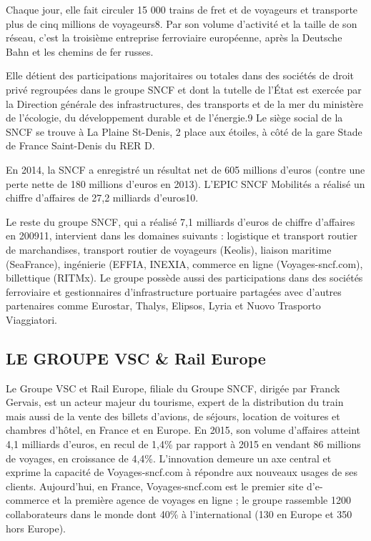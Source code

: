 Chaque jour, elle fait circuler 15 000 trains de fret et de voyageurs et transporte plus de cinq millions de voyageurs8. Par son volume d'activité et la taille de son réseau, c'est la troisième entreprise ferroviaire européenne, après la Deutsche Bahn et les chemins de fer russes.

Elle détient des participations majoritaires ou totales dans des sociétés de droit privé regroupées dans le groupe SNCF et dont la tutelle de l'État est exercée par la Direction générale des infrastructures, des transports et de la mer du ministère de l'écologie, du développement durable et de l'énergie.9 Le siège social de la SNCF se trouve à La Plaine St-Denis, 2 place aux étoiles, à côté de la gare Stade de France Saint-Denis du RER D.

En 2014, la SNCF a enregistré un résultat net de 605 millions d'euros (contre une perte nette de 180 millions d'euros en 2013). L'EPIC SNCF Mobilités a réalisé un chiffre d'affaires de 27,2 milliards d'euros10.

Le reste du groupe SNCF, qui a réalisé 7,1 milliards d'euros de chiffre d'affaires en 200911, intervient dans les domaines suivants : logistique et transport routier de marchandises, transport routier de voyageurs (Keolis), liaison maritime (SeaFrance), ingénierie (EFFIA, INEXIA, commerce en ligne (Voyages-sncf.com), billettique (RITMx). Le groupe possède aussi des participations dans des sociétés ferroviaire et gestionnaires d'infrastructure portuaire partagées avec d'autres partenaires comme Eurostar, Thalys, Elipsos, Lyria et Nuovo Trasporto Viaggiatori.

\clearpage

\subsection{LE GROUPE VSC \& Rail Europe}
Le Groupe VSC et Rail Europe, filiale du Groupe SNCF, dirigée par Franck Gervais, est un acteur majeur du tourisme, expert de la distribution du train mais aussi de la vente des billets d'avions, de séjours, location de voitures et chambres d'hôtel, en France et en Europe. En 2015, son volume d’affaires atteint 4,1 milliards d’euros, en recul de 1,4\% par rapport à 2015 en vendant 86 millions de voyages, en croissance de 4,4\%. L’innovation demeure un axe central et exprime la capacité de Voyages-sncf.com à répondre aux nouveaux usages de ses clients. Aujourd’hui, en France, Voyages-sncf.com est le premier site d’e-commerce et la première agence de voyages en ligne ; le groupe rassemble 1200 collaborateurs dans le monde dont 40\% à l'international (130 en Europe et 350 hors Europe).

